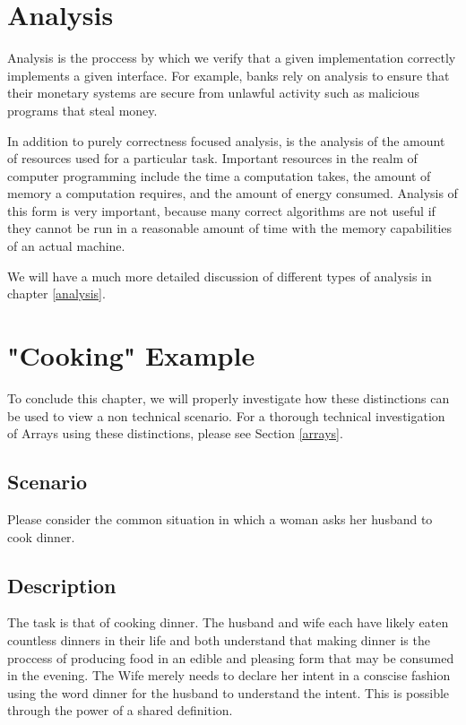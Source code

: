 \documentclass[12pt, letterpaper]{book}
\begin{document}
	\section{Analysis}

	Analysis is the proccess by which we verify that a given implementation correctly implements a given interface. For example, banks rely on analysis to ensure that their monetary systems are secure from unlawful activity such as malicious programs that steal money.

	In addition to purely correctness focused analysis, is the analysis of the amount of resources used for a particular task. Important resources in the realm of computer programming include the time a computation takes, the amount of memory a computation requires, and the amount of energy consumed. Analysis of this form is very important, because many correct algorithms are not useful if they cannot be run in a reasonable amount of time with the memory capabilities of an actual machine.

We will have a much more detailed discussion of different types of analysis in chapter \ref{analysis}.

	\section{"Cooking" Example}

To conclude this chapter, we will properly investigate how these distinctions can be used to view a non technical scenario. For a thorough technical investigation of Arrays using these distinctions, please see Section \ref{arrays}.

	\subsection{Scenario}

	Please consider the common situation in which a woman asks her husband to cook dinner.

	\subsection{Description}

	The task is that of cooking dinner. The husband and wife each have likely eaten countless dinners in their life and both understand that making dinner is the proccess of producing food in an edible and pleasing form that may be consumed in the evening. The Wife merely needs to declare her intent in a conscise fashion using the word dinner for the husband to understand the intent. This is possible through the power of a shared definition.
\end{document}

